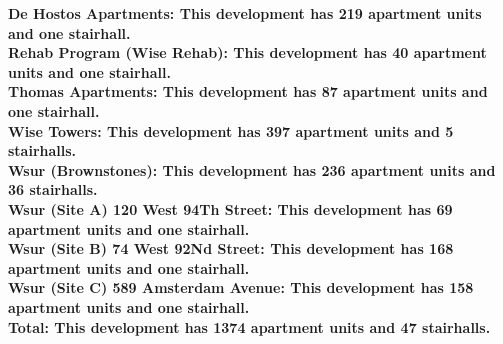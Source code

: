 \bf{De Hostos Apartments}: This development has 219 apartment units and one stairhall.\\\bf{Rehab Program (Wise Rehab)}: This development has 40 apartment units and one stairhall.\\\bf{Thomas Apartments}: This development has 87 apartment units and one stairhall.\\\bf{Wise Towers}: This development has 397 apartment units and 5 stairhalls.\\\bf{Wsur (Brownstones)}: This development has 236 apartment units and 36 stairhalls.\\\bf{Wsur (Site A) 120 West 94Th Street}: This development has 69 apartment units and one stairhall.\\\bf{Wsur (Site B) 74 West 92Nd Street}: This development has 168 apartment units and one stairhall.\\\bf{Wsur (Site C) 589 Amsterdam Avenue}: This development has 158 apartment units and one stairhall.\\\bf{Total}: This development has 1374 apartment units and 47 stairhalls.\\